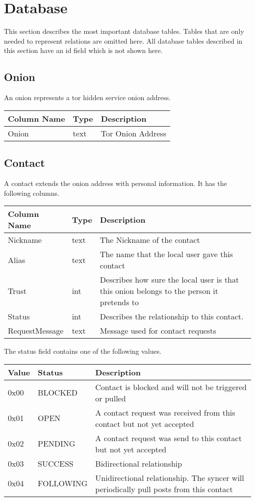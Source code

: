 \documentclass[12pt]{article}
\begin{document}
\section{Database}
\label{database}
This section describes the most important database tables. Tables that are only needed to represent relations are omitted here.
All database tables described in this section have an id field which is not shown here.   
\subsection{Onion}
An onion represents a tor hidden service onion address.

\begin{tabular}{>{\ttfamily}p{}>{\ttfamily}p{}p{}}
Column Name    & Type & Description \\ \hline \hline
  Onion & text & Tor Onion Address
\end{tabular}

\subsection{Contact}
A contact extends the onion address with personal information.
It has the following columns.

\begin{tabular}{>{\ttfamily}p{}>{\ttfamily}p{}p{}}
  Column Name    & Type & Description \\ \hline \hline
  Nickname       & text & The Nickname of the contact \\
  Alias          & text & The name that the local user gave this contact \\
  Trust          & int  & Describes how sure the local user is that this onion belongs to the person it pretends to\\
  Status         & int  & Describes the relationship to this contact. \\
  RequestMessage & text & Message used for contact requests \\
\end{tabular}

The status field contains one of the following values.

\begin{tabular}{>{\ttfamily}p{}>{\ttfamily}p{}p{}}
  Value & Status    & Description \\ \hline \hline
  0x00  & BLOCKED   & Contact is blocked and will not be triggered or pulled\\
  0x01  & OPEN      & A contact request was received from this contact but not yet accepted \\
  0x02  & PENDING   & A contact request was send to this contact but not yet accepted \\
  0x03  & SUCCESS   & Bidirectional relationship \\
  0x04  & FOLLOWING & Unidirectional relationship. The syncer will periodically pull posts from this contact
\end{tabular}
\end{document}

